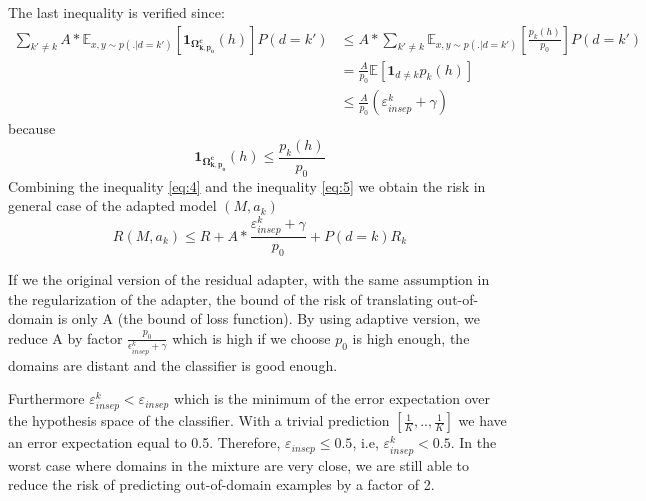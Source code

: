 \documentclass[12pt,a4paper,twoside]{report}
\theoremstyle{definition}
\newcommand{\fyTodo}[1]{\Todo[FY:]{\textcolor{orange}{#1}}}
\begin{document}
The last inequality is verified since:
\begin{equation}
\begin{split}
\displaystyle{\mathop{\sum}_{k' \neq k}} A * \mathbb{E}_{x,y \sim p(.|d=k')} [\mathbf{1}_{\mathbf{\Omega_{k,p_{0}}^{c}}} (h)]P(d=k') &\leq A * \displaystyle{\mathop{\sum}_{k' \neq k}} \mathbb{E}_{x,y \sim p(.|d=k') } [\frac{p_k(h)}{p_0}]P(d=k') \\
		& = \frac{A}{p_0} \mathbb{E}[\mathbf{1}_{d\neq k}p_k(h)] \\
		& \leq \frac{A}{p_0} (\mathbb{\varepsilon}_{insep}^k + \gamma)
\end{split}
\end{equation}
because
$$ \mathbf{1}_{\mathbf{\Omega_{k,p_{0}}^{c}}}(h) \leq \frac{p_k(h)}{p_0} $$
Combining the inequality \ref{eq:4} and the inequality \ref{eq:5} we obtain the risk in general case of the adapted model $(M,a_k)$ $$R(M,a_k) \leq R + A * \frac{\mathbb{\varepsilon}_{insep}^k + \gamma}{p_0} + P(d=k)R_k$$

If we the original version of the residual adapter, with the same assumption in the regularization of the adapter, the bound of the risk of translating out-of-domain is only A (the bound of loss function). By using adaptive version, we reduce A by factor $\frac{p_0}{\epsilon^k_{insep}+\gamma}$ which is high if we choose $p_0$ is high enough, the domains are distant and the classifier is good enough. 

Furthermore $ \varepsilon^k_{insep} < \varepsilon_{insep} $ which is the minimum of the error expectation over the hypothesis space of the classifier. With a trivial prediction $[\frac{1}{K},..,\frac{1}{K}]$ we have an error expectation equal to 0.5. Therefore, $\varepsilon_{insep} \leq 0.5$, i.e, $\varepsilon^k_{insep} < 0.5$. In the worst case where domains in the mixture are very close, we are still able to reduce the risk of predicting out-of-domain examples by a factor of 2.
\fyTodo{I sort of buy the equations but then so what ? We should may be compare with non-adaptive ?}
\end{document}
